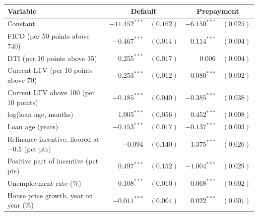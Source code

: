 \begin{tabular}{lrrrr}
\toprule
Variable & \multicolumn{2}{c}{Default} & \multicolumn{2}{c}{Prepayment} \\
\midrule
Constant & $-11.452^{***}$ & $(0.162)$ & $-6.150^{***}$ & $(0.025)$ \\
FICO (per 50 points above 740) & $-0.467^{***}$ & $(0.014)$ & $0.114^{***}$ & $(0.004)$ \\
DTI (per 10 points above 35) & $0.255^{***}$ & $(0.017)$ & $0.006$ & $(0.004)$ \\
Current LTV (per 10 points above 70) & $0.253^{***}$ & $(0.012)$ & $-0.080^{***}$ & $(0.002)$ \\
Current LTV above 100 (per 10 points) & $-0.185^{***}$ & $(0.040)$ & $-0.385^{***}$ & $(0.038)$ \\
log(loan age, months) & $1.005^{***}$ & $(0.056)$ & $0.452^{***}$ & $(0.008)$ \\
Loan age (years) & $-0.153^{***}$ & $(0.017)$ & $-0.137^{***}$ & $(0.003)$ \\
Refinance incentive, floored at $-0.5$ (pct pts) & $-0.094$ & $(0.140)$ & $1.375^{***}$ & $(0.026)$ \\
Positive part of incentive (pct pts) & $0.497^{***}$ & $(0.152)$ & $-1.004^{***}$ & $(0.029)$ \\
Unemployment rate (\%) & $0.108^{***}$ & $(0.010)$ & $0.068^{***}$ & $(0.002)$ \\
House price growth, year on year (\%) & $-0.011^{***}$ & $(0.004)$ & $0.022^{***}$ & $(0.001)$ \\
\bottomrule
\end{tabular}
